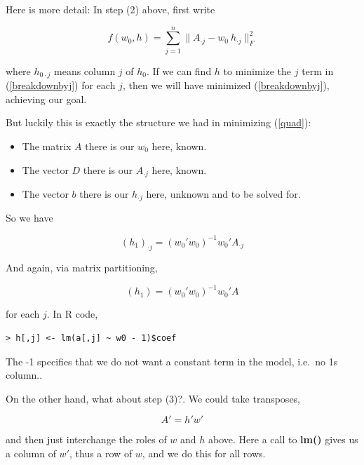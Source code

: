 Here is more detail:  In step (2) above, first write

\begin{equation}
\label{breakdownbyj}
f(w_0,h) = \sum_{j=1}^n
\|A_{\cdot j} - w_0 ~ h_{\cdot j}
\|_F^2
\end{equation}

where $h_{0 \cdot j}$ means column $j$ of $h_0$.  If we can find $h$ to
minimize the $j$ term in (\ref{breakdownbyj}) for each $j$, then we will
have minimized (\ref{breakdownbyj}), achieving our goal.

But luckily this is exactly the structure we had in minimizing
(\ref{quad}):

\begin{itemize}

\item The matrix $A$ there is our $w_0$ here, known.

\item The vector $D$ there is our $A_{\cdot j}$ here, known.

\item The vector $b$ there is our $h_{\cdot j}$ here, unknown and to be
solved for.

\end{itemize} 

So we have

\begin{equation}
(h_1)_{\cdot j} = (w_0'w_0)^{-1} w_0' A_{\cdot j}
\end{equation}

And again, via matrix partitioning,

\begin{equation}
(h_1) = (w_0'w_0)^{-1} w_0' A
\end{equation}

for each $j$.  In R code,

\begin{lstlisting}
> h[,j] <- lm(a[,j] ~ w0 - 1)$coef
\end{lstlisting}

The -1 specifies that we do not want a constant term in
the model, i.e.\ no 1s column..

On the other hand, what about step (3)?.  We could take 
transposes,

\begin{equation}
A' = h' w'
\end{equation}

and then just interchange the roles of $w$ and $h$ above.  Here a call
to {\bf lm()} gives us a column of $w'$, thus a row of $w$, and we do
this for all rows.

